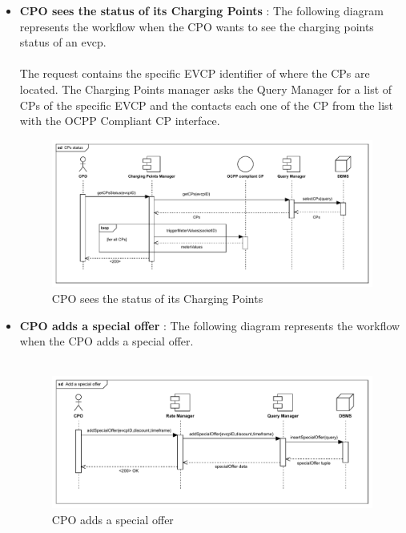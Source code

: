 \begin{itemize}
    \item \textbf{CPO sees the status of its Charging Points} : The following diagram represents the workflow when the CPO wants to see the charging points status of an evcp.\\
          \\ The request contains the specific EVCP identifier of where the CPs are located. The Charging Points manager asks the Query Manager for a list of CPs of the specific EVCP
          and the contacts each one of the CP from the list with the OCPP Compliant CP interface.
          \begin{figure}[H]
              \centering
              \includegraphics[scale=0.70]{src/runtimeView/CPMS_CPsStatus.pdf}
              \caption{CPO sees the status of its Charging Points}
          \end{figure}
          \pagebreak
    \item \textbf{CPO adds a special offer} : The following diagram represents the workflow when the CPO adds a special offer.\\
          \\
          \begin{figure}[H]
              \centering
              \includegraphics[scale=0.75]{src/runtimeView/CPMS_specialOffer.pdf}
              \caption{CPO adds a special offer}
          \end{figure}

\end{itemize}
